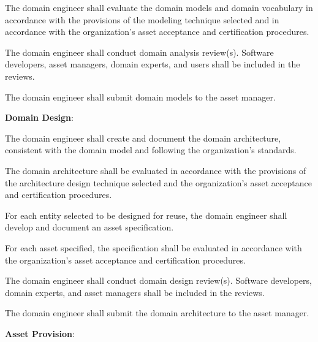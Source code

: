 \begin{adjustwidth}{2em}{0pt}
\begin{compactenum}
\begin{compactenum}
						\item The domain engineer shall evaluate the domain models and domain vocabulary in accordance with the provisions of the modeling technique selected and in accordance with the organization’s asset acceptance and certification procedures.

						\item The domain engineer shall conduct domain analysis review(s). Software developers, asset managers, domain experts, and users shall be included in the reviews.

						\item The domain engineer shall submit domain models to the asset manager.

					\end{compactenum}

					\item {\bf Domain Design}:

					\begin{compactenum}

						\item The domain engineer shall create and document the domain architecture, consistent with the domain model and following the organization’s standards.

						\item The domain architecture shall be evaluated in accordance with the provisions of the architecture design technique selected and the organization’s asset acceptance and certification procedures.

						\item For each entity selected to be designed for reuse, the domain engineer shall develop and document an asset specification.

						\item For each asset specified, the specification shall be evaluated in accordance with the organization’s asset acceptance and certification procedures.

						\item The domain engineer shall conduct domain design review(s). Software developers, domain experts, and asset managers shall be included in the reviews.

						\item The domain engineer shall submit the domain architecture to the asset manager.

					\end{compactenum}

					\item {\bf Asset Provision}:


\end{compactenum}
\end{adjustwidth}

